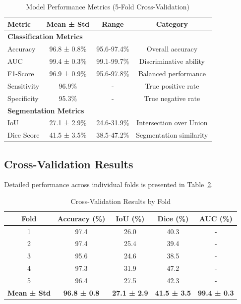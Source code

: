 \begin{table}[h]
\centering
\caption{Model Performance Metrics (5-Fold Cross-Validation)}
\label{tab:performance}
\begin{tabular}{@{}lccc@{}}
\toprule
\textbf{Metric} & \textbf{Mean ± Std} & \textbf{Range} & \textbf{Category} \\
\midrule
\multicolumn{4}{l}{\textbf{Classification Metrics}} \\
Accuracy & 96.8 ± 0.8\% & 95.6-97.4\% & Overall accuracy \\
AUC & 99.4 ± 0.3\% & 99.1-99.7\% & Discriminative ability \\
F1-Score & 96.9 ± 0.9\% & 95.6-97.8\% & Balanced performance \\
Sensitivity & 96.9\% & - & True positive rate \\
Specificity & 95.3\% & - & True negative rate \\
\midrule
\multicolumn{4}{l}{\textbf{Segmentation Metrics}} \\
IoU & 27.1 ± 2.9\% & 24.6-31.9\% & Intersection over Union \\
Dice Score & 41.5 ± 3.5\% & 38.5-47.2\% & Segmentation similarity \\
\bottomrule
\end{tabular}
\end{table}

\subsection{Cross-Validation Results}

Detailed performance across individual folds is presented in Table~\ref{tab:cv_results}.

\begin{table}[h]
\centering
\caption{Cross-Validation Results by Fold}
\label{tab:cv_results}
\begin{tabular}{@{}ccccc@{}}
\toprule
\textbf{Fold} & \textbf{Accuracy (\%)} & \textbf{IoU (\%)} & \textbf{Dice (\%)} & \textbf{AUC (\%)} \\
\midrule
1 & 97.4 & 26.0 & 40.3 & - \\
2 & 97.4 & 25.4 & 39.4 & - \\
3 & 95.6 & 24.6 & 38.5 & - \\
4 & 97.3 & 31.9 & 47.2 & - \\
5 & 96.4 & 27.5 & 42.3 & - \\
\midrule
\textbf{Mean ± Std} & \textbf{96.8 ± 0.8} & \textbf{27.1 ± 2.9} & \textbf{41.5 ± 3.5} & \textbf{99.4 ± 0.3} \\
\bottomrule
\end{tabular}
\end{table}

